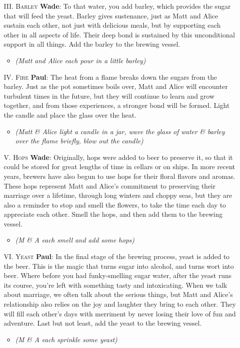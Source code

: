 \documentclass[12pt]{article}
\begin{document}
\begin{enumerate}
\begin{itemize}
    
  \item [III.] \textsc{Barley}
    {\bf Wade}: To that water, you add barley, which provides the sugar that will feed the yeast. Barley gives sustenance, just as Matt and Alice sustain each other, not just with delicious meals, but by supporting each other in all aspects of life. Their deep bond is sustained by  this unconditional support in all things. Add the barley to the brewing vessel.
    \begin{itemize}
    \item \textit{(Matt and Alice each pour in a little barley)}
    \end{itemize}

  \item [IV.] \textsc{Fire}
    {\bf Paul}: The heat from a flame breaks down the sugars from the barley. Just as the pot sometimes boils over, Matt and Alice will encounter turbulent times in the future, but they will continue to learn and grow together, and from those experiences, a stronger bond will be formed. Light the candle and place the glass over the heat.
    \begin{itemize}
    \item \textit{(Matt \& Alice light a candle in a jar, wave the glass of water \& barley over the flame briefly, blow out the candle)}
    \end{itemize}

  \item [V.] \textsc{Hops}
    {\bf Wade}: Originally, hops were added to beer to preserve it, so that it could be stored for great lengths of time in cellars or on ships. In more recent years, brewers have also begun to use hops for their floral flavors and aromas. These hops represent Matt and Alice's commitment to preserving their marriage over a lifetime, through long winters and choppy seas, but they are also a reminder to stop and smell the flowers, to take the time each day to appreciate each other. Smell the hops, and then add them to the brewing vessel.
    \begin{itemize}
    \item \textit{(M \& A each smell and add some hops)}
    \end{itemize}

  \item [VI.] \textsc{Yeast}
    {\bf Paul}: In the final stage of the brewing process, yeast is added to the beer. This is the magic that turns sugar into alcohol, and turns wort into beer. Where before you had funky-smelling sugar water, after the yeast runs its course, you're left with  something tasty and intoxicating. When we talk about marriage, we often talk about the serious things, but Matt and Alice's relationship also relies on the joy and laughter they bring to each other. They will fill each other's days with merriment by never losing their love of fun and adventure. Last but not least, add the yeast to the brewing vessel.
    \begin{itemize}
    \item \textit{(M \& A each sprinkle some yeast)}
    \end{itemize}


\end{itemize}
\end{enumerate}
\end{document}
